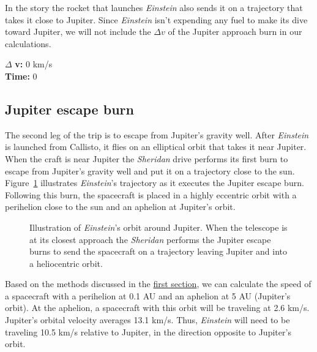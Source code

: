 \documentclass[12pt]{article} %
\begin{document}
In the story the rocket that launches \textit{Einstein} also sends it on a trajectory that takes it close to Jupiter. Since \textit{Einstein} isn't expending any fuel to make its dive toward Jupiter, we will not include the $\Delta v$ of the Jupiter approach burn in our calculations.

$\Delta$ \textbf{v:} 0 km/s\\
\textbf{Time:} 0

\subsection{Jupiter escape burn}
The second leg of the trip is to escape from Jupiter's gravity well. After \textit{Einstein} is launched from Callisto, it flies on an elliptical orbit that takes it near Jupiter. When the craft is near Jupiter the \textit{Sheridan} drive performs its first burn to escape from Jupiter's gravity well and put it on a trajectory close to the sun. Figure~\ref{jupiterescape} illustrates \textit{Einstein}'s trajectory as it executes the Jupiter escape burn. Following this burn, the spacecraft is placed in a highly eccentric orbit with a perihelion close to the sun and an aphelion at Jupiter's orbit.

\begin{figure}[H]
	\caption{Illustration of \textit{Einstein}'s orbit around Jupiter. When the telescope is at its closest approach the \textit{Sheridan} performs the Jupiter escape burns to send the spacecraft on a trajectory leaving Jupiter and into a heliocentric orbit.}
	\label{jupiterescape}
\end{figure}

Based on the methods discussed in the \hyperref[subsec:diving]{first section}, we can calculate the speed of a spacecraft with a perihelion at 0.1 AU and an aphelion at 5 AU (Jupiter's orbit). At the aphelion, a spacecraft with this orbit will be traveling at 2.6 km/s. Jupiter's orbital velocity averages 13.1 km/s. Thus, \textit{Einstein} will need to be traveling 10.5 km/s relative to Jupiter, in the direction opposite to Jupiter's orbit.
\end{document}
